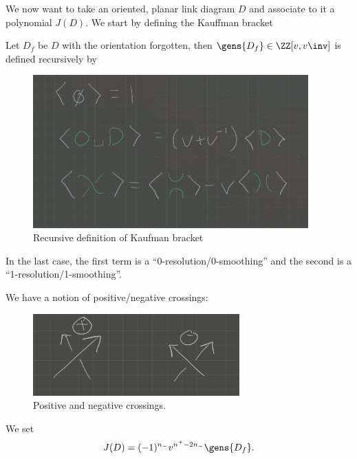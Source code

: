 We now want to take an oriented, planar link diagram \(D\) and associate
to it a polynomial \(J(D)\). We start by defining the Kauffman bracket

\begin{definition}

Let \(D_f\) be \(D\) with the orientation forgotten, then
\(\gens{D_f} \in \ZZ[v, v\inv]\) is defined recursively by

\begin{figure}
\centering
\includegraphics[width=4.16667in,height=\textheight]{figures/image_2020-07-06-11-40-29.png}
\caption{Recursive definition of Kaufman bracket}
\end{figure}

In the last case, the first term is a ``0-resolution/0-smoothing'' and
the second is a ``1-resolution/1-smoothing''.

\end{definition}

\begin{definition}

We have a notion of positive/negative crossings:

\begin{figure}
\centering
\includegraphics[width=3.125in,height=\textheight]{figures/image_2020-07-06-11-44-50.png}
\caption{Positive and negative crossings.}
\end{figure}

\end{definition}

\begin{definition}

We set
\begin{align*}
J(D) = (-1)^{n_-} v^{n^+ - 2n_-} \gens{D_f}
.\end{align*}

\end{definition}


